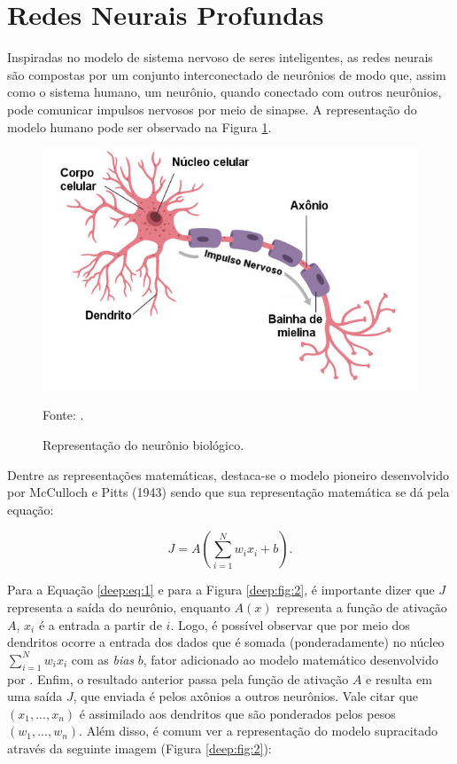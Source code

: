 \newpage
\clearpage
\section{Redes Neurais Profundas}
\label{deep:deep}

Inspiradas no modelo de sistema nervoso de seres inteligentes, as redes neurais são compostas por um conjunto interconectado de neurônios de modo que, assim como o sistema humano, um neurônio, quando conectado com outros neurônios, pode comunicar impulsos nervosos por meio de sinapse. A representação do modelo humano pode ser observado na Figura \ref{deep:fig:1}.

\begin{figure}[H]
    \centering
    \caption{Representação do neurônio biológico.}
    \includegraphics[width=1\linewidth]{recursos/imagens/deep/neuronio.jpg}
    \label{deep:fig:1}

    \vspace*{1 cm}
    Fonte: \cite{Neuronio:Educacao}.
\end{figure}

Dentre as representações matemáticas, destaca-se o modelo pioneiro desenvolvido por McCulloch e Pitts (1943) \cite{mcculloch1943logical} sendo que sua representação matemática se dá pela equação:

\begin{equation}
    \label{deep:eq:1}
    J = A(\sum_{i = 1}^{N} w_i x_i +b).
\end{equation}

Para a Equação \ref{deep:eq:1} e para a Figura \ref{deep:fig:2}, é importante dizer que $J$ representa a saída do neurônio, enquanto $A(x)$ representa a função de ativação $A$, $x_i$ é a entrada a partir de $i$. Logo, é possível observar que por meio dos dendritos ocorre a entrada dos dados que é somada (ponderadamente) no núcleo $\sum_{i = 1}^{N} w_ix_i$ com as \textit{bias} $b$, fator adicionado ao modelo matemático desenvolvido por \cite{mcculloch1943logical}. Enfim, o resultado anterior passa pela função de ativação $A$ e resulta em uma saída $J$, que enviada é pelos axônios a outros neurônios. Vale citar que $(x_1, ..., x_n)$ é assimilado aos dendritos que são ponderados pelos pesos $(w_1, ..., w_n)$. Além disso, é comum ver a representação do modelo supracitado através da seguinte imagem (Figura \ref{deep:fig:2}):

